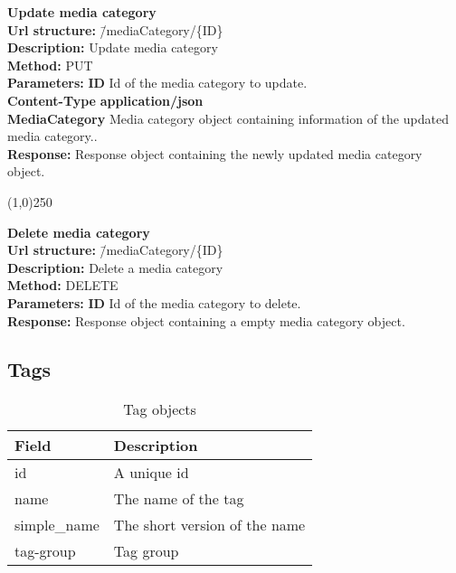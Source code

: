 \documentclass[11pt]{article}
\begin{document}
\begin{tabbing}
\textbf{Update media category} \\
\textcolor{black!60}{\textbf{Url structure:}} \hspace{0.2in} \= /mediaCategory/\{ID\} \\
\textcolor{black!60}{\textbf{Description:}}  \> Update media category \\
\textcolor{black!60}{\textbf{Method:}} \> PUT \\
\textcolor{black!60}{\textbf{Parameters:}} \> \textbf{ID} Id of the media category to update. \\
\textcolor{black!60}{\textbf{Content-Type}} \> \textbf{application/json} \\
\> \textbf{MediaCategory} Media category object containing information of the updated media category.. \\
\textcolor{black!60}{\textbf{Response:}} \> Response object containing the newly updated media category object.
\end{tabbing}

\begin{center}\line(1,0){250}\end{center}

\begin{tabbing}
\textbf{Delete media category} \\
\textcolor{black!60}{\textbf{Url structure:}} \hspace{0.2in} \= /mediaCategory/\{ID\} \\
\textcolor{black!60}{\textbf{Description:}}  \> Delete a media category \\
\textcolor{black!60}{\textbf{Method:}} \> DELETE \\
\textcolor{black!60}{\textbf{Parameters:}} \> \textbf{ID} Id of the media category to delete. \\
\textcolor{black!60}{\textbf{Response:}} \> Response object containing a empty media category object.
\end{tabbing}


\subsection{Tags}

\begin{table}[H]
\caption{Tag objects}
\begin{center}
\begin{tabular}{|l|l|}
\hline
 Field                     &  Description                    \\
\hline
 id                        &  A unique id                    \\
 name                      &  The name of the tag            \\
 simple\_name  &  The short version of the name  \\
 tag-group                 &  Tag group                      \\
\hline
\end{tabular}
\end{center}
\end{table}
\end{document}
